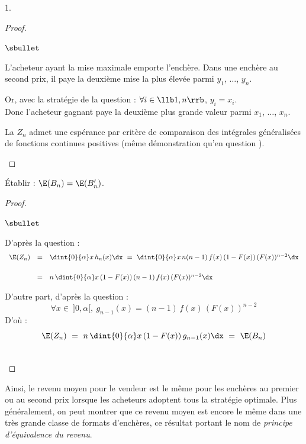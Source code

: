 \documentclass[11pt]{article}%
\begin{document}
\begin{noliste}{1.}
  \begin{proof}~
   \begin{noliste}{$\sbullet$}
    \item L'acheteur ayant la mise maximale emporte l'enchère. Dans une 
    enchère au second prix, il paye la deuxième mise la plus élevée
    parmi $y_1$, $\ldots$, $y_n$.
    
    
    \newpage
    
    
    \item Or, avec la stratégie de la question  : 
    $\forall i \in \llb 1, n \rrb$, $y_i=x_i$.\\[.2cm]
    Donc l'acheteur gagnant paye la deuxième plus grande valeur parmi
    $x_1$, $\ldots$, $x_n$.
    
    
    
    \item La \var $Z_n$ admet une espérance par critère de comparaison 
    des intégrales généralisées de fonctions continues positives (même 
    démonstration qu'en question ).
    ~\\[-1.4cm]
   \end{noliste}
  \end{proof}

  
  \item Établir : $\E(B_n) = \E(B_n')$.
  
  \begin{proof}~
    \begin{noliste}{$\sbullet$}
      \item D'après la question  : 
      \[
       \begin{array}{rcl}
        \E(Z_n) & = & \dint{0}{\alpha} x \, h_n(x) \dx \ = \
        \dint{0}{\alpha} x \, n(n-1) \, f(x) \, (1-F(x)) \, (F(x))^{n-2}
        \dx
        \\[.6cm]
        & = & n \, \dint{0}{\alpha} x \, (1-F(x)) \, (n-1) \, f(x) \,
        (F(x))^{n-2} \dx
       \end{array}
      \]
      
      \item D'autre part, d'après la question  : 
      \[
        \forall x \in \ ]0, \alpha[, \ g_{n-1}(x) = (n-1) \, f(x) \,
        (F(x))^{n-2}
      \]
      D'où :
      \[
        \E(Z_n) \ = \ n \, \dint{0}{\alpha} x \, (1-F(x)) \, g_{n-1}(x)
        \dx \ = \ \E(B_n)
      \]
    \end{noliste}
    ~\\[-1cm]
  \end{proof}
\end{noliste}
Ainsi, le revenu moyen pour le vendeur est le même pour les enchères au 
premier ou au second prix lorsque les acheteurs adoptent tous la 
stratégie optimale. Plus généralement, on peut montrer que ce revenu 
moyen est encore le même dans une très grande classe de formats 
d'enchères, ce résultat portant le nom de \emph{principe d'équivalence 
du revenu}.
\end{document}
